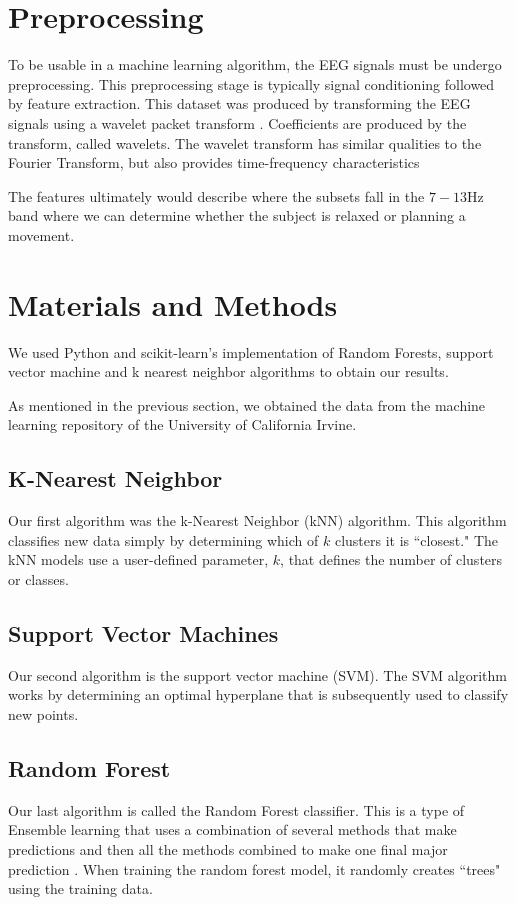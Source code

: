 \documentclass[conference,compsoc]{IEEEtran}
\begin{document}
\section{Preprocessing}
To be usable in a machine learning algorithm, the EEG signals must be undergo preprocessing.  This preprocessing stage is typically signal conditioning followed by feature extraction.  This dataset was produced by transforming the EEG signals using a wavelet packet transform \cite{wavelet} . Coefficients are produced by the transform, called wavelets. The wavelet transform has similar qualities to the Fourier Transform, but also provides time-frequency characteristics%

The features ultimately would describe where the subsets fall in the $7-13\si{\hertz}$ band where we can determine whether the subject is relaxed or planning a movement.

\section{Materials and Methods}
We used Python and scikit-learn's implementation of Random Forests, support vector machine and k nearest neighbor algorithms to obtain our results.  

As mentioned in the previous section, we obtained the data from the machine learning repository of the University of California Irvine.

\subsection{K-Nearest Neighbor}
Our first algorithm was the k-Nearest Neighbor (kNN) algorithm.  This algorithm classifies new data simply by determining which of $k$ clusters it is ``closest."
The kNN models use a user-defined parameter, $k$, that defines the number of clusters or classes. 

\subsection{Support Vector Machines}
Our second algorithm is the support vector machine (SVM).  The SVM algorithm works by determining an optimal hyperplane \cite{classsvm} that is subsequently used to classify new points. 

\subsection{Random Forest}
Our last algorithm is  called the Random Forest classifier.  This is a type of Ensemble learning that uses a combination of several methods that make predictions and then all the methods combined to make one final major prediction \cite{random}. When training the random forest model, it randomly creates ``trees" using the training data. 
\end{document}

